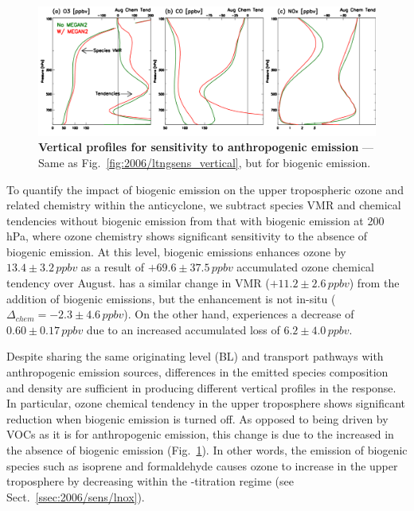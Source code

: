 	\begin{figure}[t!]
		\centering
		\includegraphics[width=1.0\textwidth]{sens/biosens_vert}
		\caption[Vertical profiles for sensitivity to anthropogenic emission]{\textbf{Vertical profiles for sensitivity to
		anthropogenic emission} --- Same as Fig.~\ref{fig:2006/ltngsens_vertical}, but for biogenic emission.
		\label{fig:2006/biosens_vert} }\vspace{-.3in}
	\end{figure}

To quantify the impact of biogenic emission on the upper tropospheric ozone and related chemistry within the anticyclone,
we subtract species VMR and chemical tendencies without biogenic emission from that with biogenic emission at
200\,\unit{hPa}, where ozone chemistry shows significant sensitivity to the absence of biogenic emission. At this level,
biogenic emissions enhances ozone by $13.4\pm3.2\,\unit{ppbv}$ as a result of $+69.6\pm37.5\,\unit{ppbv}$ accumulated
ozone chemical tendency over August.  has a similar change in VMR ($+11.2\pm2.6\,\unit{ppbv}$) from the
addition of biogenic emissions, but the enhancement is not in-situ ($\Delta_{chem}=-2.3\pm4.6\,\unit{ppbv}$). On the other
hand,  experiences a decrease of $0.60\pm0.17\,\unit{ppbv}$ due to an increased accumulated loss of
$6.2\pm4.0\,\unit{ppbv}$.

Despite sharing the same originating level (BL) and transport pathways with anthropogenic emission sources, differences
in the emitted species composition and density are sufficient in producing different vertical profiles in the response. In
particular, ozone chemical tendency in the upper troposphere shows significant reduction when biogenic emission is
turned off. As opposed to being driven by VOCs as it is for anthropogenic emission, this change is due to the increased
 in the absence of biogenic emission (Fig.~\ref{fig:2006/biosens_vert}). In other words, the emission of
biogenic species such as isoprene and formaldehyde causes ozone to increase in the upper troposphere by decreasing
 within the -titration regime (see Sect.~\ref{ssec:2006/sens/lnox}).


